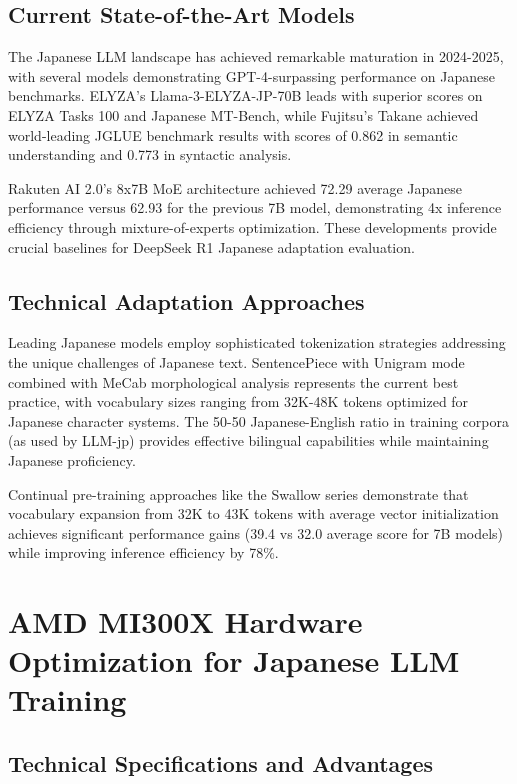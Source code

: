 \documentclass[11pt,a4paper]{article}
\begin{document}
\subsection{Current State-of-the-Art Models}

The Japanese LLM landscape has achieved remarkable maturation in 2024-2025, with several models demonstrating GPT-4-surpassing performance on Japanese benchmarks. ELYZA's Llama-3-ELYZA-JP-70B leads with superior scores on ELYZA Tasks 100 and Japanese MT-Bench, while Fujitsu's Takane achieved world-leading JGLUE benchmark results with scores of 0.862 in semantic understanding and 0.773 in syntactic analysis.

Rakuten AI 2.0's 8x7B MoE architecture achieved 72.29 average Japanese performance versus 62.93 for the previous 7B model, demonstrating 4x inference efficiency through mixture-of-experts optimization. These developments provide crucial baselines for DeepSeek R1 Japanese adaptation evaluation.

\subsection{Technical Adaptation Approaches}

Leading Japanese models employ sophisticated tokenization strategies addressing the unique challenges of Japanese text. SentencePiece with Unigram mode combined with MeCab morphological analysis represents the current best practice, with vocabulary sizes ranging from 32K-48K tokens optimized for Japanese character systems. The 50-50 Japanese-English ratio in training corpora (as used by LLM-jp) provides effective bilingual capabilities while maintaining Japanese proficiency.

Continual pre-training approaches like the Swallow series demonstrate that vocabulary expansion from 32K to 43K tokens with average vector initialization achieves significant performance gains (39.4 vs 32.0 average score for 7B models) while improving inference efficiency by 78\%.

\section{AMD MI300X Hardware Optimization for Japanese LLM Training}

\subsection{Technical Specifications and Advantages}
\end{document}

